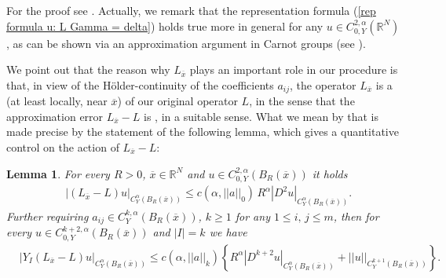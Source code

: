 \documentclass{article}
\newtheorem{lemma}[theorem]{Lemma}
\numberwithin{equation}{section}
\begin{document}
\vspace{2mm}

\hspace{-7mm} For the proof see \cite[Theorem 6.18]{librone}. Actually, we remark that the representation formula (\ref{rep formula u: L Gamma = delta}) holds true more in general for any $u \in C^{2,\alpha}_{0,Y}(\mathbb{R}^N)$, as can be shown via an approximation argument in Carnot groups (see \cite[Proposition 8.49]{librone}).

\vspace{2mm}

\hspace{-7mm} We point out that the reason why $L_{\overline{x}}$ plays an important role in our procedure is that, in view of the Hölder-continuity of the coefficients $a_{ij}$, the operator $L_{\overline{x}}$ is a  (at least locally, near $\overline{x}$) of our original operator $L$, in the sense that the approximation error $L_{\overline{x}}-L$ is , in a suitable sense. What we mean by that is made precise by the statement of the following lemma, which gives a quantitative control on the action of $L_{\overline{x}}-L$:

\vspace{2mm}

\begin{lemma}
\label{C^alpha estimate for L_x-L}
    For every $R>0$, $\overline{x} \in \mathbb{R}^N$ and $u \in C^{2,\alpha}_{0,Y}(B_R(\overline{x}))$ it holds
    \begin{align*}
        & |(L_{\overline{x}}-L)u|_{C^{\alpha}_Y(B_R(\overline{x}))} \leq c(
        \alpha, ||a||_0) \, R^{\alpha} |D^2 u|_{C^{\alpha}_Y(B_R(\overline{x}))}.
    \end{align*}
    Further requiring $a_{ij} \in C^{k,\alpha}_Y(B_R(\overline{x}))$, $k \geq 1$ for any $1 \leq i, \, j \leq m$, then for every $u \in C^{k+2,\alpha}_{0,Y}(B_R(\overline{x}))$ and $|I|=k$ we have
\begin{align*}
    & |Y_I (L_{\overline{x}} - L) u|_{C^{\alpha}_Y(B_R(\overline{x}))} \leq c(\alpha, ||a||_k) \left\{ R^{\alpha} |D^{k+2} u|_{C^{\alpha}_Y(B_R(\overline{x}))} + ||u||_{C^{k+1}_Y(B_R(\overline{x}))} \right\}.
\end{align*}
\end{lemma}

\vspace{2mm}
\end{document}
